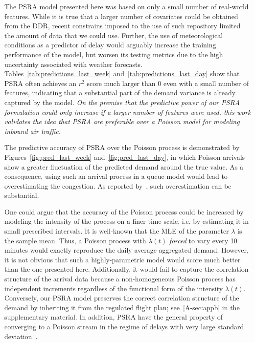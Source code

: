 \documentclass[draft,review]{elsarticle}
\makeatletter
\newcommand*{\ie}{i.e.\@\xspace}
\makeatother
\begin{document}
  The \ac{PSRA} model presented here was based on only a small number of real-world features.
  While it is true that a larger number of covariates could be obtained from the \ac{DDR}, recent constrains imposed to the use of such repository limited the amount of data that we could use.
  Further, the use of meteorological conditions as a predictor of delay would arguably increase the training performance of the model, but worsen its testing metrics due to the high uncertainty associated with weather forecasts.
  Tables~\ref{tab:predictions_last_week} and~\ref{tab:predictions_last_day} show that \ac{PSRA} often achieves an \(r^2\) score much larger than 0 even with a small number of features, indicating that a substantial part of the demand variance is already captured by the model.
  \emph{On the premise that the predictive power of our  \ac{PSRA} formulation could only increase if a larger number of features were used, this work validates the idea that \ac{PSRA} are preferable over a Poisson model for modeling inbound air traffic.}

  The predictive accuracy of \ac{PSRA} over the Poisson process is demonstrated by Figures~\ref{fig:pred_last_week} and~\ref{fig:pred_last_day}, in which Poisson arrivals show a greater fluctuation of the predicted demand around the true value.
  As a consequence, using such an arrival process in a queue model would lead to overestimating the congestion.
  As reported by~\citet{caccavale2014model}, such overestimation can be substantial.

  One could argue that the accuracy of the Poisson process could be increased by modeling the intensity of the process on a finer time scale, \ie{} by estimating it in small prescribed intervals. It is well-known that the \ac{MLE} of the parameter \(\lambda\) is the sample mean.
  Thus, a Poisson process with \(\lambda(t)\) \emph{forced} to vary every 10 minutes would  exactly reproduce the daily average aggregated demand.
  However, it is not obvious that such a highly-parametric model would score much better than the one presented here.
  Additionally, it would fail to capture the correlation structure of the arrival data because a non-homogeneous Poisson process has independent increments regardless of the functional form of the intensity \(\lambda(t)\).
  Conversely, our \ac{PSRA} model preserves the correct correlation structure of the demand by inheriting it from the regulated flight plan; see~\ref{A-sec:appb} in the supplementary material.
  In addition, \ac{PSRA} have the general property of converging to a Poisson stream in the regime of delays with very large standard deviation~\citep{guadagni2011queueing}.
\end{document}
